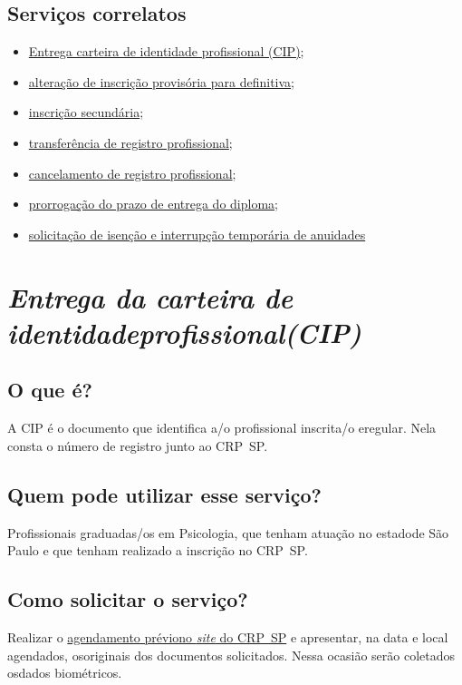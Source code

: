 \section{Serviços correlatos}

\begin{itemize}
  \item  \hyperref[]{Entrega  carteira de identidade profissional (CIP)};
  \item  \hyperref[]{alteração  de inscrição provisória para definitiva};
  \item  \hyperref[]{inscrição secundária};
  \item  \hyperref[]{transferência de  registro profissional};
  \item  \hyperref[]{cancelamento de  registro profissional};
  \item  \hyperref[]{prorrogação  do prazo de entrega do diploma};
  \item  \hyperref[]{solicitação  de isenção e interrupção temporária de anuidades}
\end{itemize}

\chapter{\texorpdfstring{\emph{Entrega da carteira de identidadeprofissional(CIP)}}{Entrega da carteira de identidade profissional (CIP)}}

\section{O que é?}

A CIP é o documento que identifica a/o profissional inscrita/o eregular. Nela consta o número de registro junto ao CRP~SP.

\section{Quem pode utilizar esse serviço?}

Profissionais graduadas/os em Psicologia, que tenham atuação no estadode São Paulo e que tenham realizado a inscrição no CRP~SP.

\section{Como solicitar o serviço?}

Realizar o \href{https://www.crpsp.org/agendamento}{agendamento préviono \emph{site} do CRP~SP} e apresentar, na data e local agendados, osoriginais dos documentos solicitados. Nessa ocasião serão coletados osdados biométricos.

